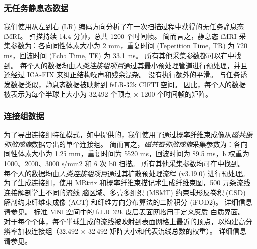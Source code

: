 \documentclass[lang=cn,a4paper,newtx]{elegantpaper}
\begin{document}
\subsubsection{无任务静息态数据} \label{sec:sup_2_2}
我们使用从左到右 (LR) 编码方向分析了在一次扫描过程中获得的无任务静息态 fMRI。
扫描持续 14.4 分钟，总共 1200 个时间帧。
简而言之，静息态 fMRI 采集参数为：各向同性体素大小为 2 mm，重复时间 (Tepetition Time, TR) 为 720 ms，回波时间 (Echo Time, TE) 为 33.1 ms。
所有其他采集参数都可以在\cite{van2013wu}中找到。
每个人的数据均由\textit{人类连接组项目}通过其最小预处理管道进行预处理\cite{glasser2013minimal}，并且还经过 ICA-FIX 来纠正结构噪声和残余混杂\cite{salimi2014automatic}。
没有执行额外的平滑。
与任务诱发数据类似，静息态数据被映射到 fsLR-32k CIFTI 空间。
因此，每个人的数据被表示为每个半球上大小为 32,492 个顶点 × 1200 个时间帧的矩阵。


\subsubsection{连接组数据} \label{sec:sup_2_3}

为了导出连接组特征模式，如\cite{tian2021high}中提供的，我们使用了通过概率纤维束成像从\textit{磁共振弥散成像}数据导出的单个连接组。
简而言之，\textit{磁共振弥散成像}采集参数为：各向同性体素大小为 1.25 mm，重复时间为 5520 ms，回波时间为 89.5 ms，b 权重为 1000、2000、3000 s/mm2 和 6 次 b0 扫描。
所有其他采集参数均可在\cite{van2013wu}中找到。
每个人的数据均由\textit{人类连接组项目}通过其扩散预处理流程 (v3.19.0) \cite{glasser2013minimal}进行预处理。
为了生成连接组，使用 MRtrix 和概率纤维束描记术生成纤维束图，500 万条流线连接解剖学上不同的流线 脑区域、多壳多组织 (MSMT) 约束球形反卷积 (CSD) 解剖约束纤维束成像 (ACT) 和纤维方向分布算法的二阶积分 (iFOD2)。
详细信息请参见\cite{tian2021high}。
标准 MNI 空间中的 fsLR-32k 皮层表面网格用于定义灰质-白质界面。
对于每个个体，每个半球生成的流线被映射到表面网格上最近的顶点，以构建高分辨率加权连接组（32,492 × 32,492 矩阵大小和代表流线总数的权重）。
详细信息请参见\cite{tian2021high}。
\end{document}
